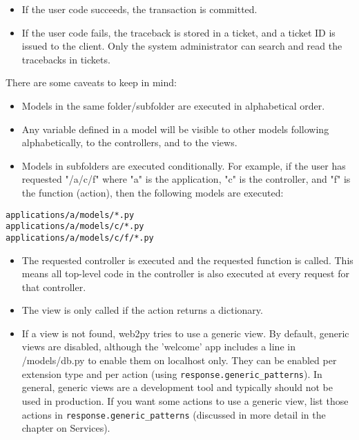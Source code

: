 \documentclass[justified,sixbynine,notoc]{tufte-book}
\def\ft{\small\tt}
\begin{document}
\begin{fullwidth}
\begin{itemize}
\item If the user code succeeds, the transaction is committed.

\item If the user code fails, the traceback is stored in a ticket, and a ticket ID is issued to the client. Only the system administrator can search and read the tracebacks in tickets.
\end{itemize}

There are some caveats to keep in mind:
\begin{itemize}
\item Models in the same folder/subfolder are executed in alphabetical order.

\item Any variable defined in a model will be visible to other models following alphabetically, to the controllers, and to the views.

\item Models in subfolders are executed conditionally. For example, if the user has requested "/a/c/f" where "a" is the application, "c" is the controller, and "f" is the function (action), then the following models are executed:
\end{itemize}

\begin{lstlisting}
applications/a/models/*.py
applications/a/models/c/*.py
applications/a/models/c/f/*.py
\end{lstlisting}

\begin{itemize}
\item The requested controller is executed and the requested function is called. This means all top-level code in the controller is also executed at every request for that controller.

\item The view is only called if the action returns a dictionary.

\item If a view is not found, web2py tries to use a generic view. By default, generic views are disabled, although the 'welcome' app includes a line in /models/db.py to enable them on localhost only. They can be enabled per extension type and per action (using {\ft response.generic\_patterns}). In general, generic views are a development tool and typically should not be used in production. If you want some actions to use a generic view, list those actions in {\ft response.generic\_patterns} (discussed in more detail in the chapter on Services).
\end{itemize}


\end{fullwidth}
\end{document}
